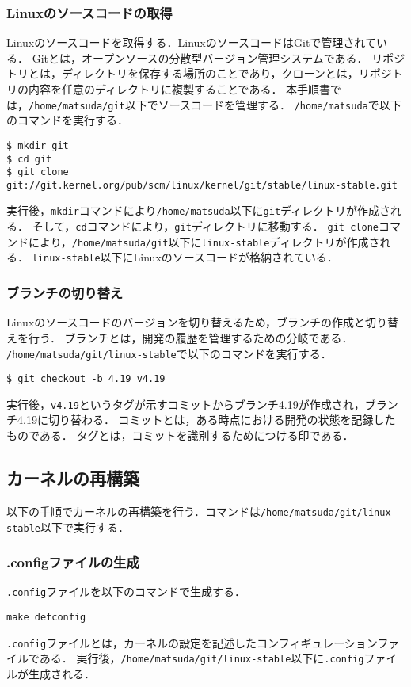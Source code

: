 \documentclass[12pt]{jsarticle}
\begin{document}
\subsubsection{Linuxのソースコードの取得}
Linuxのソースコードを取得する．LinuxのソースコードはGitで管理されている．
Gitとは，オープンソースの分散型バージョン管理システムである．
リポジトリとは，ディレクトリを保存する場所のことであり，クローンとは，リポジトリの内容を任意のディレクトリに複製することである．
本手順書では，\verb|/home/matsuda/git|以下でソースコードを管理する．
\verb|/home/matsuda|で以下のコマンドを実行する．
\begin{verbatim}
$ mkdir git
$ cd git
$ git clone git://git.kernel.org/pub/scm/linux/kernel/git/stable/linux-stable.git
\end{verbatim}
実行後，\verb|mkdir|コマンドにより\verb|/home/matsuda|以下に\verb|git|ディレクトリが作成される．
そして，\verb|cd|コマンドにより，\verb|git|ディレクトリに移動する．
\verb|git clone|コマンドにより，\verb|/home/matsuda/git|以下に\verb|linux-stable|ディレクトリが作成される．
\verb|linux-stable|以下にLinuxのソースコードが格納されている．

\subsubsection{ブランチの切り替え}
Linuxのソースコードのバージョンを切り替えるため，ブランチの作成と切り替えを行う．
ブランチとは，開発の履歴を管理するための分岐である．
\verb|/home/matsuda/git/linux-stable|で以下のコマンドを実行する．
\begin{verbatim}
$ git checkout -b 4.19 v4.19
\end{verbatim}
実行後，\verb|v4.19|というタグが示すコミットからブランチ4.19が作成され，ブランチ4.19に切り替わる．
コミットとは，ある時点における開発の状態を記録したものである．
タグとは，コミットを識別するためにつける印である．

\subsection{カーネルの再構築}
以下の手順でカーネルの再構築を行う．コマンドは\verb|/home/matsuda/git/linux-stable|以下で実行する．
\subsubsection{.configファイルの生成}
\verb|.config|ファイルを以下のコマンドで生成する．
\begin{verbatim}
make defconfig
\end{verbatim}
\verb|.config|ファイルとは，カーネルの設定を記述したコンフィギュレーションファイルである．
実行後，\verb|/home/matsuda/git/linux-stable|以下に\verb|.config|ファイルが生成される．
\end{document}
